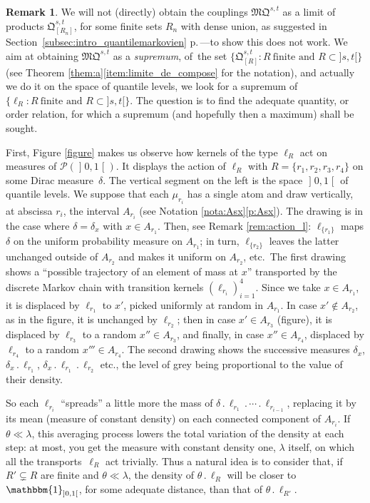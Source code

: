 \documentclass[JEP,XML,SOM,Unicode,NoEqCountersInSection,NoFloatCountersInSection,published]{cedram}
\newcommand{\ldot}{\mathbin{.}}
\newcommand{\lcdots}{\ldot\cdots\ldot}
\theoremstyle{plain}
\theoremstyle{definition}
\newtheorem{rem}[them]{Remark}
\newcommand{\como}{\mathfrak{Q}}
\newcommand{\mq}{\mathfrak{MQ}}
\newcommand{\one}{\mathbbm{1}}
\newcommand{\la}{\lambda}
\newcommand{\p}{\mathcal{P}}
\newcommand{\op}{\mathopen}
\newcommand{\clo}{\mathclose}
\begin{document}
\begin{rem}\label{rem:qualitative}We will not (directly) obtain the couplings $\mq^{s,t}$ as a limit of products $\como^{s,t}_{[R_n]}$, for some finite sets $R_n$ with dense union, as suggested in Section~\ref{subsec:intro_quantilemarkovien} p.\,\pageref{page:tentative_limite}---to show this does not work. We aim at obtaining $\mq^{s,t}$ as a \emph{supremum}, of~the set $\{\como^{s,t}_{[R]} : R\ \text{finite and } R\subset]s,t[\}$ (see Theorem \ref{them:a}\eqref{item:limite_de_compose} for the notation), and actually we do it on the space of quantile levels, \ie we look for a supremum of $\{\ell_R : R\ \text{finite and } R\subset]s,t[\}$. The question is to find the adequate quantity, or order relation, for which a supremum (and hopefully then a maximum) shall be sought.

First, Figure \ref{figure} makes us observe how kernels of the type $\ell_R$ act on measures of $\p(\op]0,1\clo[)$. It displays the action of $\ell_{R}$ with $R=\{r_1,r_2,r_3,r_4\}$ on some Dirac measure~$\delta$. The vertical segment on the left is the space $\op]0,1\clo[$ of quantile levels. We suppose that each $\mu_{r_i}$ has a single atom and draw vertically, at abscissa $r_i$, the interval $A_{r_i}$ (see Notation \ref{nota:Asx}\eqref{p:Asx}). The drawing is in the case where $\delta=\delta_{x}$ with $x\in A_{r_1}$. Then, see Remark \ref{rem:action_l}: $\ell_{\{r_1\}}$ maps $\delta$ on the uniform probability measure on $A_{r_1}$; in turn, $\ell_{\{r_2\}}$ leaves the latter unchanged outside of $A_{r_2}$ and makes it uniform on $A_{r_2}$, etc.\ The first drawing shows a ``possible trajectory of an element of mass at $x$'' transported by the discrete Markov chain with transition kernels $(\ell_{r_i})_{i=1}^4$. Since we take $x \in A_{r_1}$, it is displaced by $\ell_{r_1}$ to $x '$, picked uniformly at random in $A_{r_1}$. In case $x '\not\in A_{r_2}$, as in the figure, it is unchanged by $\ell_{r_2}$; then in case $x '\in A_{r_3}$ (figure), it is displaced by $\ell_{r_3}$ to a random $x ''\in A_{r_3}$, and finally, in case $x ''\in A_{r_4}$, displaced by $\ell_{r_4}$ to a random $x '''\in A_{r_4}$. The second drawing shows the successive measures $\delta_x $, $\delta_x \ldot\ell_{r_1}$, $\delta_x \ldot\ell_{r_1}{}\ldot\ell_{r_2}$ etc., the level of grey being proportional to the value of their density.

So each $\ell_{r_i}$ ``spreads'' a little more the mass of $\delta\ldot\ell_{r_1}\lcdots \ell_{r_{i-1}}$, replacing it by its mean (measure of constant density) on each connected component of $A_{r_i}$. If~$\theta\ll\la$, this averaging process lowers the total variation of the density at each step: at most, you get the measure with constant density one, \ie $\la$ itself, on which all the transports~$\ell_{R}$ act trivially. Thus a natural idea is to consider that, if ${R'}\subsetneq R$ are finite and $\theta\ll\la$, the density of $\theta\ldot \ell_{R}$ will be closer to $\one_{\op]0,1\clo[}$, for some adequate distance, than that of $\theta\ldot \ell_{R'}$.


\end{rem}
\end{document}
